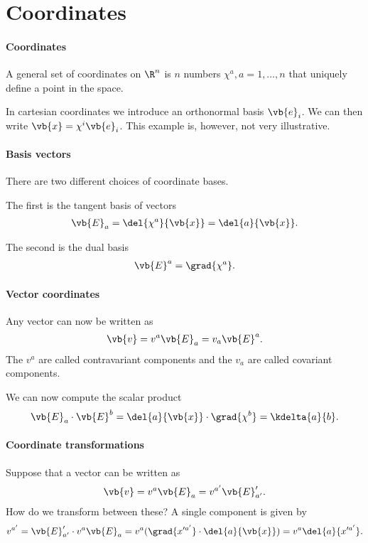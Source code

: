 \section{Coordinates}

\paragraph{Coordinates}
A general set of coordinates on $\R^{n}$ is $n$ numbers $\chi^{a}, a = 1, \dots, n$ that uniquely define a point in the space.

In cartesian coordinates we introduce an orthonormal basis $\vb{e}_{i}$. We can then write $\vb{x} = \chi^{i}\vb{e}_{i}$. This example is, however, not very illustrative.

\paragraph{Basis vectors}
There are two different choices of coordinate bases.

The first is the tangent basis of vectors
\begin{align*}
	\vb{E}_{a} = \del{\chi^{a}}{\vb{x}} = \del{a}{\vb{x}}.
\end{align*}

The second is the dual basis
\begin{align*}
	\vb{E}^{a} = \grad{\chi^{a}}.
\end{align*}

\paragraph{Vector coordinates}
Any vector can now be written as
\begin{align*}
	\vb{v} = v^{a}\vb{E}_{a} = v_{a}\vb{E}^{a}.
\end{align*}
The $v^{a}$ are called contravariant components and the $v_{a}$ are called covariant components.

We can now compute the scalar product
\begin{align*}
	\vb{E}_{a}\cdot\vb{E}^{b} = \del{a}{\vb{x}}\cdot\grad{\chi^{b}} = \kdelta{a}{b}.
\end{align*}

\paragraph{Coordinate transformations}
Suppose that a vector can be written as
\begin{align*}
	\vb{v} = v^{a}\vb{E}_{a} = v^{a'}\vb{E}_{a'}'.
\end{align*}
How do we transform between these? A single component is given by
\begin{align*}
	v^{a'} = \vb{E}_{a'}'\cdot v^{a}\vb{E}_{a} = v^{a}(\grad{x'^{a'}}\cdot\del{a}{\vb{x}}) = v^{a}\del{a}{x'^{a'}}.
\end{align*}

